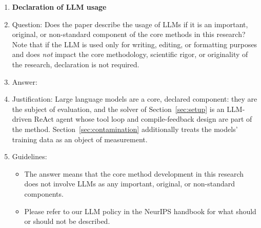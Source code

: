 \begin{enumerate}
\item {\bf Declaration of LLM usage}
    \item[] Question: Does the paper describe the usage of LLMs if it is an important, original, or non-standard component of the core methods in this research? Note that if the LLM is used only for writing, editing, or formatting purposes and does \emph{not} impact the core methodology, scientific rigor, or originality of the research, declaration is not required.
    \item[] Answer: \answerYes{}
    \item[] Justification: Large language models are a core, declared component: they are the subject of evaluation, and the solver of Section~\ref{sec:setup} is an LLM-driven ReAct agent whose tool loop and compile-feedback design are part of the method. Section~\ref{sec:contamination} additionally treats the models' training data as an object of measurement.
    \item[] Guidelines:
    \begin{itemize}
        \item The answer \answerNA{} means that the core method development in this research does not involve LLMs as any important, original, or non-standard components.
        \item Please refer to our LLM policy in the NeurIPS handbook for what should or should not be described.
    \end{itemize}

\end{enumerate}